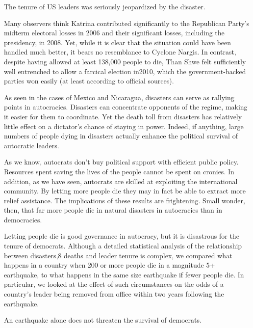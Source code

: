 \documentclass[10pt]{article}
\begin{document}
{\large The tenure of US leaders was seriously jeopardized by the disaster.}

{\large Many observers think Katrina contributed significantly to the Republican
Party's midterm electoral losses in 2006 and their significant losses, including
the presidency, in 2008. Yet, while it is clear that the situation could have
been handled much better, it bears no resemblance to Cyclone Nargis. In contrast,
despite having allowed at least 138,000 people to die, Than Shwe felt
sufficiently well entrenched to allow a farcical election in2010, which the
government-backed parties won easily (at least according to official sources).}

{\large As seen in the cases of Mexico and Nicaragua, disasters can serve as
rallying points in autocracies. Disasters can concentrate opponents of the
regime, making it easier for them to coordinate. Yet the death toll from
disasters has relatively little effect on a dictator's chance of staying in
power. Indeed, if anything, large numbers of people dying in disasters actually
enhance the political survival of autocratic leaders.}

{\large As we know, autocrats don't buy political support with efficient public
policy. Resources spent saving the lives of the people cannot be spent on
cronies. In addition, as we have seen, autocrats are skilled at exploiting the
international community. By letting more people die they may in fact be able to
extract more relief assistance. The implications of these results are
frightening. Small wonder, then, that far more people die in natural disasters in
autocracies than in democracies.}

{\large Letting people die is good governance in autocracy, but it is disastrous
for the tenure of democrats. Although a detailed statistical analysis of the
relationship between disasters,8 deaths and leader tenure is complex, we compared
what happens in a country when 200 or more people die in a magnitude 5+
earthquake, to what happens in the same size earthquake if fewer people die. In
particular, we looked at the effect of such circumstances on the odds of a
country's leader being removed from office within two years following the
earthquake.}

{\large An earthquake alone does not threaten the survival of democrats.}
\end{document}

